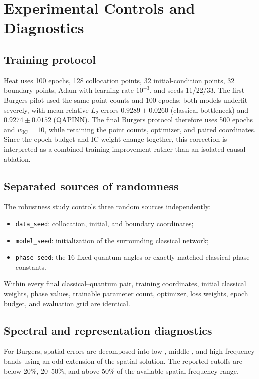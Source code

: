 \documentclass[10pt,a4paper]{article}
\begin{document}
\section{Experimental Controls and Diagnostics}

\subsection{Training protocol}

Heat uses 100 epochs, 128 collocation points, 32 initial-condition points, 32 boundary points, Adam with learning rate $10^{-3}$, and seeds 11/22/33. The first Burgers pilot used the same point counts and 100 epochs; both models underfit severely, with mean relative $L_2$ errors $0.9289\pm0.0260$ (classical bottleneck) and $0.9274\pm0.0152$ (QAPINN). The final Burgers protocol therefore uses 500 epochs and $w_{\mathrm{IC}}=10$, while retaining the point counts, optimizer, and paired coordinates. Since the epoch budget and IC weight change together, this correction is interpreted as a combined training improvement rather than an isolated causal ablation.

\subsection{Separated sources of randomness}

The robustness study controls three random sources independently:
\begin{itemize}
  \item \texttt{data\_seed}: collocation, initial, and boundary coordinates;
  \item \texttt{model\_seed}: initialization of the surrounding classical network;
  \item \texttt{phase\_seed}: the 16 fixed quantum angles or exactly matched classical phase constants.
\end{itemize}
Within every final classical--quantum pair, training coordinates, initial classical weights, phase values, trainable parameter count, optimizer, loss weights, epoch budget, and evaluation grid are identical.

\subsection{Spectral and representation diagnostics}

For Burgers, spatial errors are decomposed into low-, middle-, and high-frequency bands using an odd extension of the spatial solution. The reported cutoffs are below 20\%, 20--50\%, and above 50\% of the available spatial-frequency range.
\end{document}
